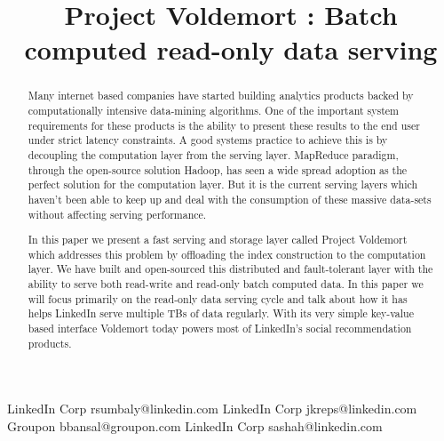 \documentclass[10pt,twocolumn,preprint,natbib,authoryear]{sigplanconf}
\begin{document}
\copyrightdata{[to be supplied]} 


\title{Project Voldemort : Batch computed read-only data serving}

           {LinkedIn Corp}
           {rsumbaly@linkedin.com}
           {LinkedIn Corp}
           {jkreps@linkedin.com}
		   {Groupon}
           {bbansal@groupon.com}
           {LinkedIn Corp}
           {sashah@linkedin.com}


				
\maketitle

\begin{abstract}
Many internet based companies have started building analytics products backed by computationally intensive data-mining algorithms. One of the important system requirements for these products is the ability to present these results to the end user under strict latency constraints. A good systems practice to achieve this is by decoupling the computation layer from the serving layer. MapReduce paradigm, through the open-source solution Hadoop, has seen a wide spread adoption as the perfect solution for the computation layer. But it is the current serving layers which haven't been able to keep up and deal with the consumption of these massive data-sets without affecting serving performance. 

In this paper we present a fast serving and storage layer called Project Voldemort which addresses this problem by offloading the index construction to the computation layer. We have built and open-sourced this distributed and fault-tolerant layer with the ability to serve both read-write and read-only batch computed data. In this paper we will focus primarily on the read-only data serving cycle and talk about how it has helps LinkedIn serve multiple TBs of data regularly. With its very simple key-value based interface Voldemort today powers most of LinkedIn's social recommendation products. 
\end{abstract}
\end{document}
